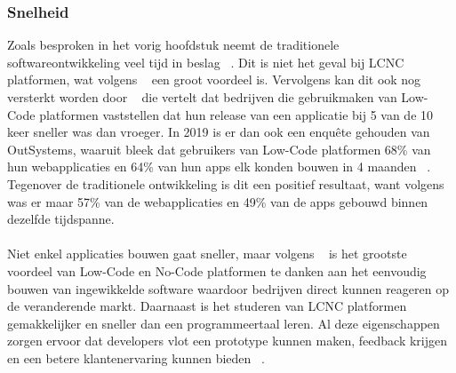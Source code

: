 \subsubsection{Snelheid}
\label{subsec:snelheid}
Zoals besproken in het vorig hoofdstuk neemt de traditionele softwareontwikkeling veel tijd in beslag ~\autocite{Moskal_2021}. 
Dit is niet het geval bij LCNC platformen, wat volgens ~\textcite{Adrian_2020} een groot voordeel is. 
Vervolgens kan dit ook nog versterkt worden door ~\textcite{Yan2021} die vertelt dat bedrijven die gebruikmaken van 
Low-Code platformen vaststellen dat hun release van een applicatie bij 5 van de 10 keer sneller was dan vroeger. In 2019 is er dan ook een enquête gehouden van OutSystems, 
waaruit bleek dat gebruikers van Low-Code platformen 68\% van hun webapplicaties en 64\% van hun apps elk konden bouwen in 4 maanden ~\autocite{Yan2021}. 
Tegenover de traditionele ontwikkeling is dit een positief resultaat, want volgens ~\textcite{Yan2021} was er maar 57\% van de webapplicaties en 49\% van de apps gebouwd binnen dezelfde tijdspanne.
\\
\\
Niet enkel applicaties bouwen gaat sneller, maar volgens ~\textcite{da_Cruz_2021} is het grootste voordeel van Low-Code en No-Code platformen 
te danken aan het eenvoudig bouwen van ingewikkelde software waardoor bedrijven direct kunnen reageren op de veranderende markt. 
Daarnaast is het studeren van LCNC platformen gemakkelijker en sneller dan een programmeertaal leren. 
Al deze eigenschappen zorgen ervoor dat developers vlot een prototype kunnen maken, feedback krijgen en een betere klantenervaring kunnen bieden ~\autocite{da_Cruz_2021}.
